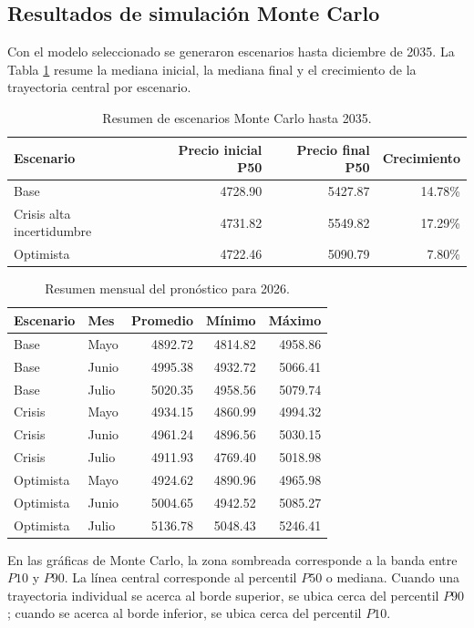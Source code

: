 \documentclass[12pt,letterpaper]{article}
\begin{document}
\subsection{Resultados de simulación Monte Carlo}
Con el modelo seleccionado se generaron escenarios hasta diciembre de 2035. La Tabla \ref{tab:escenarios2035} resume la mediana inicial, la mediana final y el crecimiento de la trayectoria central por escenario.

\begin{table}[H]
\centering
\caption{Resumen de escenarios Monte Carlo hasta 2035.}
\label{tab:escenarios2035}
\begin{tabular}{lrrr}
\toprule
Escenario & Precio inicial P50 & Precio final P50 & Crecimiento \\
\midrule
Base & 4728.90 & 5427.87 & 14.78\% \\
Crisis alta incertidumbre & 4731.82 & 5549.82 & 17.29\% \\
Optimista & 4722.46 & 5090.79 & 7.80\% \\
\bottomrule
\end{tabular}
\end{table}

\begin{table}[H]
\centering
\caption{Resumen mensual del pronóstico para 2026.}
\begin{tabular}{llrrr}
\toprule
Escenario & Mes & Promedio & Mínimo & Máximo \\
\midrule
Base & Mayo & 4892.72 & 4814.82 & 4958.86 \\
Base & Junio & 4995.38 & 4932.72 & 5066.41 \\
Base & Julio & 5020.35 & 4958.56 & 5079.74 \\
Crisis & Mayo & 4934.15 & 4860.99 & 4994.32 \\
Crisis & Junio & 4961.24 & 4896.56 & 5030.15 \\
Crisis & Julio & 4911.93 & 4769.40 & 5018.98 \\
Optimista & Mayo & 4924.62 & 4890.96 & 4965.98 \\
Optimista & Junio & 5004.65 & 4942.52 & 5085.27 \\
Optimista & Julio & 5136.78 & 5048.43 & 5246.41 \\
\bottomrule
\end{tabular}
\end{table}

En las gráficas de Monte Carlo, la zona sombreada corresponde a la banda entre $P10$ y $P90$. La línea central corresponde al percentil $P50$ o mediana. Cuando una trayectoria individual se acerca al borde superior, se ubica cerca del percentil $P90$; cuando se acerca al borde inferior, se ubica cerca del percentil $P10$.
\end{document}
